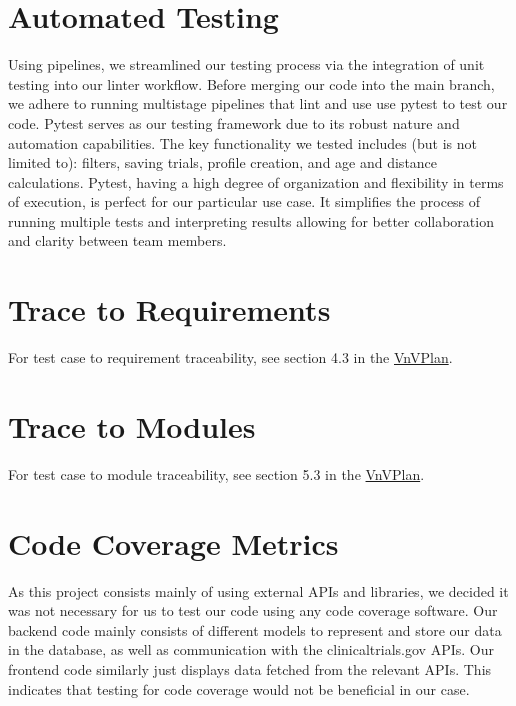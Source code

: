 \documentclass[12pt, titlepage]{article}
\begin{document}
\section{Automated Testing}
Using pipelines, we streamlined our testing process via the integration of unit
testing into our linter workflow. Before merging our code into the main branch, we adhere
to running multistage pipelines that lint and use use pytest to test our code.
Pytest serves as our testing framework
due to its robust nature and automation capabilities. The key functionality we tested includes (but is not limited to):
filters, saving trials, profile creation, and age and distance calculations. Pytest, having a high degree of organization and flexibility
in terms of execution, is perfect
for our particular use case. It simplifies the process of running multiple tests and interpreting results
allowing for better collaboration and clarity between team members.


\section{Trace to Requirements}

For test case to requirement traceability, see section 4.3 in the \href{https://github.com/davimang/REACH/blob/main/docs/VnVPlan/VnVPlan.pdf}{VnVPlan}.
\section{Trace to Modules}
For test case to module traceability, see section 5.3 in the \href{https://github.com/davimang/REACH/blob/main/docs/VnVPlan/VnVPlan.pdf}{VnVPlan}.

\section{Code Coverage Metrics}

As this project consists mainly of using external APIs and libraries, we decided it was not necessary
for us to test our code using any code coverage software. Our backend code mainly consists of different
models to represent and store our data in the database, as well as communication with the clinicaltrials.gov APIs.
Our frontend code similarly just displays data fetched from the relevant APIs. This indicates that testing for code
coverage would not be beneficial in our case.


%
\end{document}
